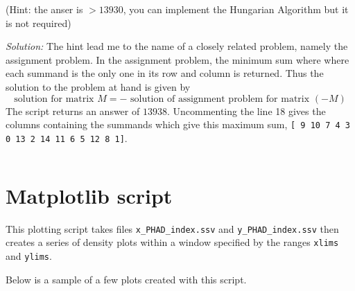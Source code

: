 \documentclass{article}
\newcommand{\mintedpython}[1]{\inputminted[frame=lines,framesep=2mm,baselinestretch=1.2,bgcolor=LightGray,fontsize=\footnotesize,linenos]{python}{#1}}
\begin{document}
(Hint: the anser is $>13930$, you can implement the Hungarian Algorithm but it is not required)

\bigskip

{\it Solution:} The hint lead me to the name of a closely related problem, namely the assignment problem.  In the assignment problem, the minimum sum where where each summand is the only one in its row and column is returned.  Thus the solution to the problem at hand is given by
\[\text{solution for matrix } M=-\text{ solution of assignment problem for matrix }(-M)\] 
The script returns an answer of $13938$.  Uncommenting the line 18 gives the columns containing the summands which give this maximum sum, \texttt{[ 9 10  7  4  3  0 13  2 14 11  6  5 12  8  1]}.

\mintedpython{Python_coding_challenge/problem3.py}


\section{Matplotlib script}
\label{sec:matplotlib}

This plotting script takes files \texttt{x{\_}PHAD{\_}\textlangle{}index\textrangle{}.ssv} and \texttt{y{\_}PHAD{\_}\textlangle{}index\textrangle{}.ssv} then creates a series of density plots within a window specified by the ranges \texttt{xlims} and \texttt{ylims}. 

\bigskip
Below is a sample of a few plots created with this script.
\end{document}
